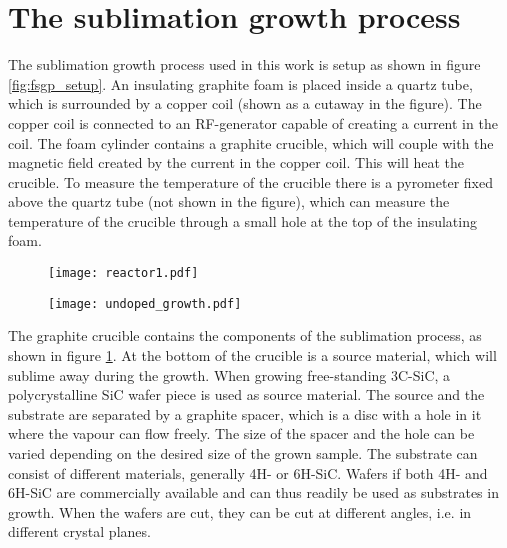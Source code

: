 \section{The sublimation growth process}
\label{sec:growth:fsgp}
The sublimation growth process used in this work is setup as shown in figure \ref{fig:fsgp_setup}. An insulating graphite foam is placed inside a quartz tube, which is surrounded by a copper coil (shown as a cutaway in the figure). The copper coil is connected to an RF-generator capable of creating a current in the coil. The foam cylinder contains a graphite crucible, which will couple with the magnetic field created by the current in the copper coil. This will heat the crucible. To measure the temperature of the crucible there is a pyrometer fixed above the quartz tube (not shown in the figure), which can measure the temperature of the crucible through a small hole at the top of the insulating foam. 

\begin{figure}[h]
\centering
\begin{minipage}{.5\textwidth}
  \centering
  \texttt{[image: reactor1.pdf]}
  \label{fig:fsgp_setup}
\end{minipage}%
\begin{minipage}{.5\textwidth}
  \centering
  \texttt{[image: undoped\_growth.pdf]}
  \label{fig:undoped_growth}
\end{minipage}
\end{figure}

The graphite crucible contains the components of the sublimation process, as shown in figure \ref{fig:undoped_growth}. At the bottom of the crucible is a source material, which will sublime away during the growth. When growing free-standing 3C-SiC, a polycrystalline SiC wafer piece is used as source material. The source and the substrate are separated by a graphite spacer, which is a disc with a hole in it where the vapour can flow freely. The size of the spacer and the hole can be varied depending on the desired size of the grown sample. The substrate can consist of different materials, generally 4H- or 6H-SiC. Wafers if both 4H- and 6H-SiC are commercially available and can thus readily be used as substrates in growth. When the wafers are cut, they can be cut at different angles, i.e. in different crystal planes.

